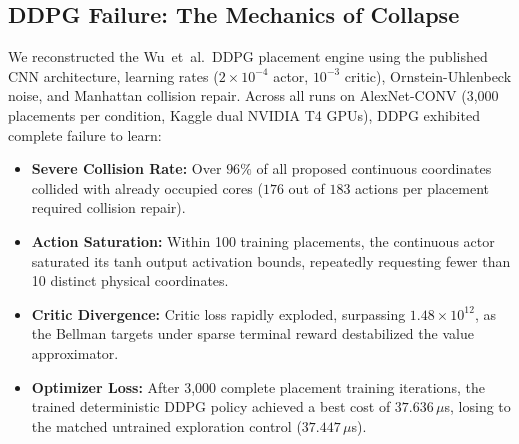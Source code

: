 \documentclass[10pt,conference]{IEEEtran}
\begin{document}
\subsection{DDPG Failure: The Mechanics of Collapse}
We reconstructed the Wu~et~al.\ DDPG placement engine using the published CNN architecture, learning rates ($2 \times 10^{-4}$ actor, $10^{-3}$ critic), Ornstein-Uhlenbeck noise, and Manhattan collision repair. Across all runs on AlexNet-CONV (3,000 placements per condition, Kaggle dual NVIDIA T4 GPUs), DDPG exhibited complete failure to learn:
\begin{itemize}
  \item \textbf{Severe Collision Rate:} Over $96\%$ of all proposed continuous coordinates collided with already occupied cores ($176$ out of $183$ actions per placement required collision repair).
  \item \textbf{Action Saturation:} Within 100 training placements, the continuous actor saturated its tanh output activation bounds, repeatedly requesting fewer than 10 distinct physical coordinates.
  \item \textbf{Critic Divergence:} Critic loss rapidly exploded, surpassing $1.48 \times 10^{12}$, as the Bellman targets under sparse terminal reward destabilized the value approximator.
  \item \textbf{Optimizer Loss:} After 3,000 complete placement training iterations, the trained deterministic DDPG policy achieved a best cost of $37.636\,\mu$s, losing to the matched untrained exploration control ($37.447\,\mu$s).
\end{itemize}
\end{document}
